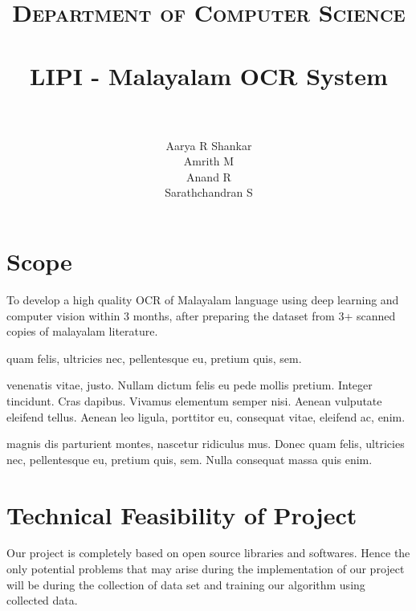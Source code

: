 \documentclass[paper=a4, fontsize=11pt]{scrartcl}
\title{
		\usefont{OT1}{bch}{b}{n}
		\normalfont \normalsize \textsc{Department of Computer Science} \\ [25pt]
		\horrule{0.5pt} \\[0.4cm]
		\huge LIPI - Malayalam OCR System \\
		\horrule{2pt} \\[0.5cm]
}
\author{
		\normalfont 								\normalsize
        Aarya R Shankar\\[-3pt]		\normalsize
        Amrith M\\[-3pt]		\normalsize
        Anand R\\[-3pt]		\normalsize
        \newline
        Sarathchandran S\\[-3pt]		\normalsize
}
\date{}
\numberwithin{equation}{section}		%
\numberwithin{figure}{section}			%
\numberwithin{table}{section}				%
\begin{document}
\maketitle
\section{Scope}
To develop a high quality OCR of Malayalam language using deep learning and computer vision within 3 months, after preparing the dataset from 
3+ scanned copies of malayalam literature.

quam felis, ultricies nec, pellentesque eu, pretium quis, sem.

venenatis vitae, justo. Nullam dictum felis eu pede mollis pretium. Integer tincidunt. Cras dapibus. Vivamus elementum semper nisi. Aenean 
vulputate eleifend tellus. Aenean leo ligula, porttitor eu, consequat vitae, eleifend ac, enim.

magnis dis parturient montes, nascetur ridiculus mus. Donec quam felis, ultricies nec, pellentesque eu, pretium quis, sem. Nulla consequat 
massa quis enim.


\section{ Technical Feasibility of Project}
Our project is completely based on open source libraries and softwares. Hence the only potential problems that may arise during the 
implementation of our project will be during the collection of data set and training our algorithm using collected data.
\end{document}
